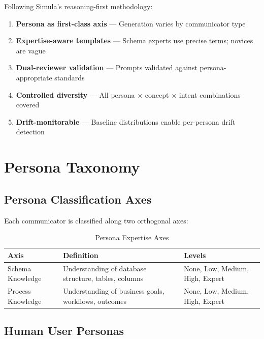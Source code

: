 Following Simula's reasoning-first methodology:

\begin{enumerate}
  \item \textbf{Persona as first-class axis} --- Generation varies by communicator type
  \item \textbf{Expertise-aware templates} --- Schema experts use precise terms; novices are vague
  \item \textbf{Dual-reviewer validation} --- Prompts validated against persona-appropriate standards
  \item \textbf{Controlled diversity} --- All persona $\times$ concept $\times$ intent combinations covered
  \item \textbf{Drift-monitorable} --- Baseline distributions enable per-persona drift detection
\end{enumerate}

\section{Persona Taxonomy}
\label{sec:persona-taxonomy}

\subsection{Persona Classification Axes}

Each communicator is classified along two orthogonal axes:

\begin{table}[htbp]
\centering
\caption{Persona Expertise Axes}
\label{tab:persona-axes}
\begin{tabular}{l l l}
\toprule
\textbf{Axis} & \textbf{Definition} & \textbf{Levels} \\
\midrule
Schema Knowledge & Understanding of database structure, tables, columns & None, Low, Medium, High, Expert \\
Process Knowledge & Understanding of business goals, workflows, outcomes & None, Low, Medium, High, Expert \\
\bottomrule
\end{tabular}
\end{table}

\subsection{Human User Personas}

